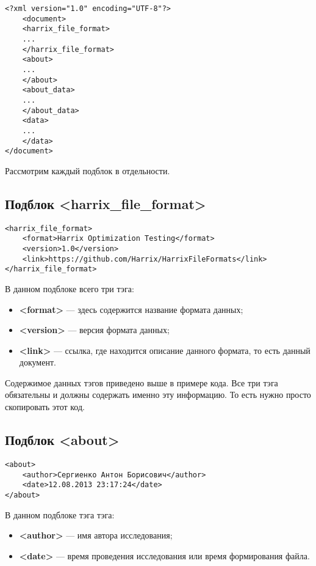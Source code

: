 \documentclass[a4paper,12pt]{article}
\begin{document}
\begin{lstlisting}[label=Part03,caption=Подблоки в файле Harrix Optimization Testing]
<?xml version="1.0" encoding="UTF-8"?>
	<document>
	<harrix_file_format>
	...
	</harrix_file_format>
	<about>
	...
	</about>
	<about_data>
	...
	</about_data>
	<data>
	...
	</data>
</document>
\end{lstlisting}

Рассмотрим каждый подблок в отдельности.

\subsection{Подблок <harrix\_file\_format>}

\begin{lstlisting}[label=Part04,caption=Подблок в файле Harrix Optimization Testing]
<harrix_file_format>
	<format>Harrix Optimization Testing</format>
	<version>1.0</version>
	<link>https://github.com/Harrix/HarrixFileFormats</link>
</harrix_file_format>
\end{lstlisting}

В данном подблоке всего три тэга:
\begin{itemize}
\item \textbf{<format>} --- здесь содержится название формата данных;
\item \textbf{<version>} --- версия формата данных;
\item \textbf{<link>} --- ссылка, где находится описание данного формата, то есть данный документ.
\end{itemize}

Содержимое данных тэгов приведено выше в примере кода. Все три тэга обязательны и должны содержать именно эту информацию. То есть нужно просто скопировать этот код.

\subsection{Подблок <about>}

\begin{lstlisting}[label=Part04,caption=Подблок в файле Harrix Optimization Testing]
<about>
	<author>Сергиенко Антон Борисович</author>
	<date>12.08.2013 23:17:24</date>
</about>
\end{lstlisting}

В данном подблоке тэга тэга:
\begin{itemize}
\item \textbf{<author>} --- имя автора исследования;
\item \textbf{<date>} --- время проведения исследования или время формирования файла.
\end{itemize}
\end{document}
